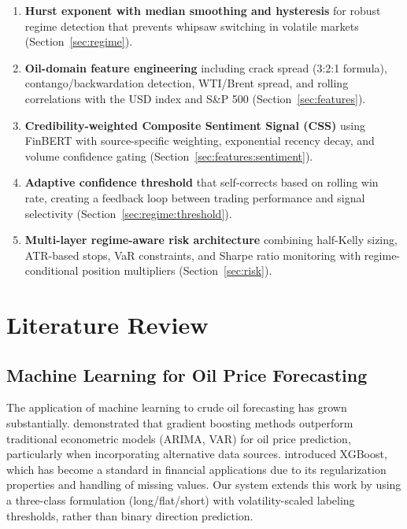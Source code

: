 \documentclass[12pt,a4paper]{article}
\begin{document}
\begin{enumerate}[leftmargin=*]
    \item \textbf{Hurst exponent with median smoothing and hysteresis} for robust regime detection that prevents whipsaw switching in volatile markets (Section~\ref{sec:regime}).

    \item \textbf{Oil-domain feature engineering} including crack spread (3:2:1 formula), contango/backwardation detection, WTI/Brent spread, and rolling correlations with the USD index and S\&P 500 (Section~\ref{sec:features}).

    \item \textbf{Credibility-weighted Composite Sentiment Signal (CSS)} using FinBERT \citep{araci2019finbert} with source-specific weighting, exponential recency decay, and volume confidence gating (Section~\ref{sec:features:sentiment}).

    \item \textbf{Adaptive confidence threshold} that self-corrects based on rolling win rate, creating a feedback loop between trading performance and signal selectivity (Section~\ref{sec:regime:threshold}).

    \item \textbf{Multi-layer regime-aware risk architecture} combining half-Kelly sizing, ATR-based stops, VaR constraints, and Sharpe ratio monitoring with regime-conditional position multipliers (Section~\ref{sec:risk}).
\end{enumerate}

\section{Literature Review}
\label{sec:literature}

\subsection{Machine Learning for Oil Price Forecasting}

The application of machine learning to crude oil forecasting has grown substantially. \citet{zhang2019crude} demonstrated that gradient boosting methods outperform traditional econometric models (ARIMA, VAR) for oil price prediction, particularly when incorporating alternative data sources. \citet{chen2016xgboost} introduced XGBoost, which has become a standard in financial applications due to its regularization properties and handling of missing values. Our system extends this work by using a three-class formulation (long/flat/short) with volatility-scaled labeling thresholds, rather than binary direction prediction.
\end{document}
